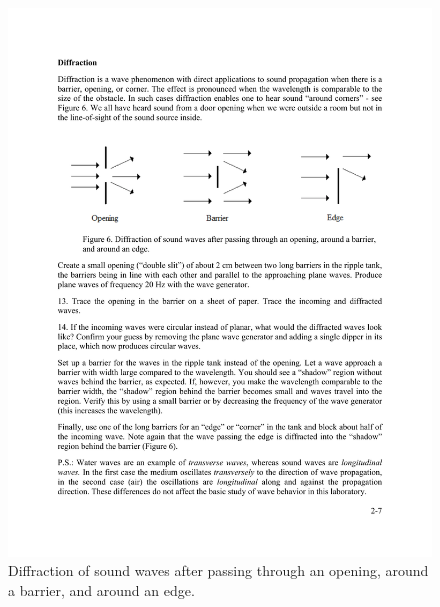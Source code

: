 \documentclass[11pt]{NSF}
\begin{document}
%
\begin{figure}[hbtp]
\begin{center}
\includegraphics[width=.95\textwidth]{fig2_6}
\caption{Diffraction of sound waves after passing through an opening, 
around a barrier, and around an edge.}
\label{f:6}
\end{center}
\end{figure}
%
\end{document}
